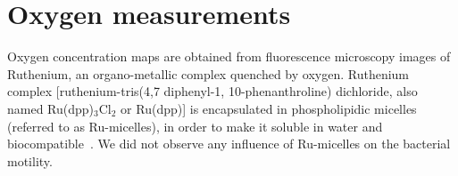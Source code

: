 \documentclass[aps,a4paper,twocolumn,10pt,pre,showpacs]{revtex4-2}
\begin{document}






\appendix



\section{Oxygen measurements}
\label{sec:SM_O2}

Oxygen concentration maps are obtained from fluorescence microscopy images of Ruthenium, an organo-metallic complex quenched by oxygen. Ruthenium complex [ruthenium-tris(4,7 diphenyl-1, 10-phenanthroline) dichloride, also named Ru(dpp)$_3$Cl$_2$ or Ru(dpp)] is encapsulated in phospholipidic micelles (referred to as Ru-micelles), in order to make it soluble in water and biocompatible~\cite{douarche2009coli,morse2016}. We did not observe any influence of Ru-micelles on the bacterial motility. 
\end{document}
